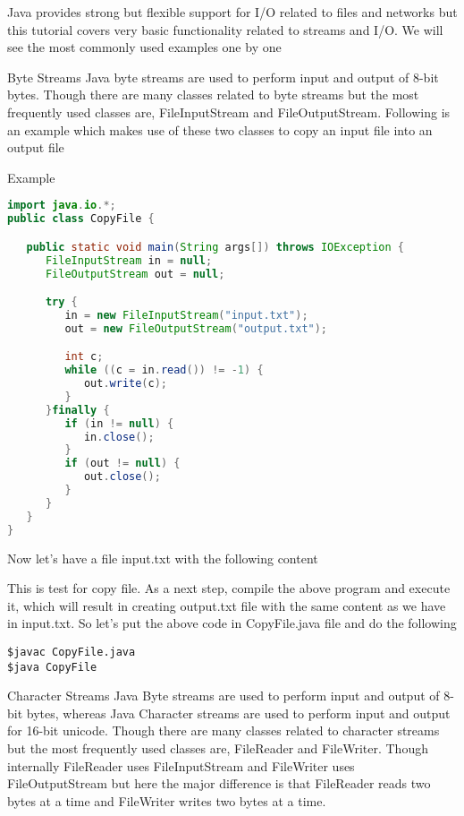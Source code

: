 Java provides strong but flexible support for I/O related to files and networks but this tutorial covers very basic functionality related to streams and I/O. We will see the most commonly used examples one by one

Byte Streams
Java byte streams are used to perform input and output of 8-bit bytes. Though there are many classes related to byte streams but the most frequently used classes are, FileInputStream and FileOutputStream. Following is an example which makes use of these two classes to copy an input file into an output file

Example

\begin{lstlisting}[language=Java]
import java.io.*;
public class CopyFile {

   public static void main(String args[]) throws IOException {
      FileInputStream in = null;
      FileOutputStream out = null;

      try {
         in = new FileInputStream("input.txt");
         out = new FileOutputStream("output.txt");

         int c;
         while ((c = in.read()) != -1) {
            out.write(c);
         }
      }finally {
         if (in != null) {
            in.close();
         }
         if (out != null) {
            out.close();
         }
      }
   }
}
\end{lstlisting}

Now let's have a file input.txt with the following content

This is test for copy file.
As a next step, compile the above program and execute it, which will result in creating output.txt file with the same content as we have in input.txt. So let's put the above code in CopyFile.java file and do the following

\begin{lstlisting}
$javac CopyFile.java
$java CopyFile
\end{lstlisting}

Character Streams
Java Byte streams are used to perform input and output of 8-bit bytes, whereas Java Character streams are used to perform input and output for 16-bit unicode. Though there are many classes related to character streams but the most frequently used classes are, FileReader and FileWriter. Though internally FileReader uses FileInputStream and FileWriter uses FileOutputStream but here the major difference is that FileReader reads two bytes at a time and FileWriter writes two bytes at a time.


